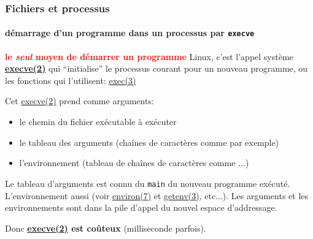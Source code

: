 \documentclass[xcolor=svgnames,final,smaller,a4]{beamer}
\begin{document}
\begin{frame}
  \frametitle{Fichiers et processus}
  \framesubtitle{démarrage d'un programme dans un processus par \texttt{execve}}

   \textbf{\textcolor{red}{le \textit{seul} moyen de démarrer un programme}}
   Linux, c'est l'appel système
   \href{https://man7.org/linux/man-pages/man2/execve.2.html}{\textbf{execve(2)}}
   qui ``initialise'' le processus courant pour un nouveau programme,
   ou les fonctions qui l'utilisent:
   \href{https://man7.org/linux/man-pages/man3/exec.3.html}{exec(3)}

   Cet 
   \href{https://man7.org/linux/man-pages/man2/execve.2.html}{execve(2)} prend comme arguments:

   \begin{itemize}
   \item le chemin du fichier exécutable {} à exécuter  

   \item le tableau des arguments (chaînes de caractères comme
       par exemple)
     
   \item l'environnement (tableau de chaînes de caractères comme
      ...)
     
   \end{itemize}

   \begin{relsize}{-1}
   Le tableau d'arguments est connu du \texttt{main} du nouveau programme
   exécuté. L'environnement aussi (voir
   \href{https://man7.org/linux/man-pages/man7/environ.7.html}{environ(7)}
   et
   \href{https://man7.org/linux/man-pages/man3/getenv.3.html}{getenv(3)}, etc...). Les arguments et les environnements sont dans la pile d'appel du nouvel espace d'addressage.
   \end{relsize}

   Donc  \textbf{\href{https://man7.org/linux/man-pages/man2/execve.2.html}{execve(2)} est coûteux} (milliseconde parfois).
   
\end{frame}
\end{document}
